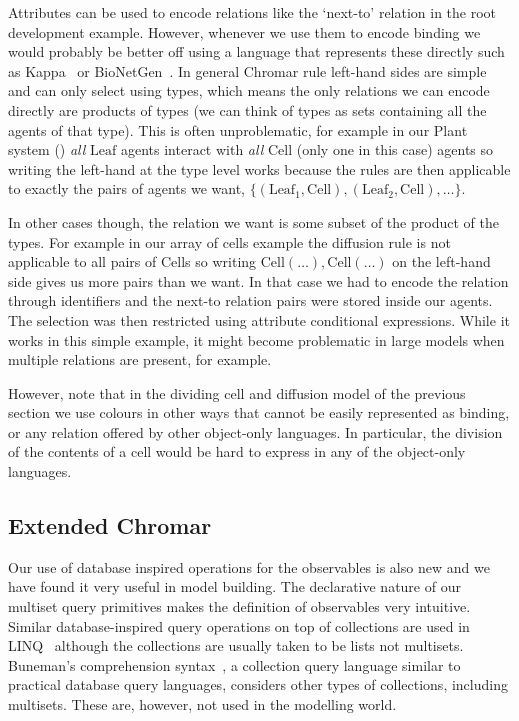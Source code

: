Attributes can be used to encode relations like the `next-to' relation in the
root development example.  However, whenever we use them to encode binding we
would probably be better off using a language that represents these directly
such as Kappa~\citep{danos_rule-based_2008} or
BioNetGen~\citep{blinov_bionetgen:_2004}. In general Chromar rule left-hand
sides are simple and can only select using types, which means the only relations
we can encode directly are products of types (we can think of types as sets
containing all the agents of that type). This is often unproblematic, for
example in our Plant system () \textit{all} $\mathrm{Leaf}$
agents interact with \textit{all} $\mathrm{Cell}$ (only one in this case) agents
so writing the left-hand at the type level works because the rules are then
applicable to exactly the pairs of agents we want,
$\{ (\mathrm{Leaf}_1, \mathrm{Cell}), (\mathrm{Leaf}_2, \mathrm{Cell}), \dots
\}$.

In other cases though, the relation we want is some subset of the product of the
types. For example in our array of cells example the diffusion rule is not
applicable to all pairs of $\mathrm{Cell}$s so writing
$\mathrm{Cell}(\dots), \mathrm{Cell}(\dots)$ on the left-hand side gives us more
pairs than we want.  In that case we had to encode the relation through
identifiers and the next-to relation pairs were stored inside our agents. The
selection was then restricted using attribute conditional expressions. While it
works in this simple example, it might become problematic in large models when
multiple relations are present, for example.

However, note that in the dividing cell and diffusion model of the previous
section we use colours in other ways that cannot be easily represented as
binding, or any relation offered by other object-only languages. In particular,
the division of the contents of a cell would be hard to express in any of the
object-only languages.


\subsection{Extended Chromar}
Our use of database inspired operations for the observables is also new and we
have found it very useful in model building. The declarative nature of our
multiset query primitives makes the definition of observables very
intuitive. Similar database-inspired query operations on top of collections are
used in LINQ~\citep{budiu_compiler_2013} although the collections are usually taken
to be lists not multisets. Buneman's comprehension
syntax~\citep{buneman_comprehension_1994}, a collection query language similar to
practical database query languages, considers other types of collections,
including multisets. These are, however, not used in the modelling world.

